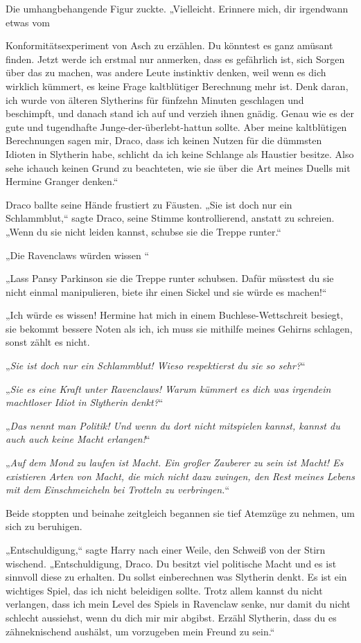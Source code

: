 {Die umhangbehangende Figur zuckte. „Vielleicht. Erinnere mich, dir irgendwann etwas vom

Konformitätsexperiment von Asch zu erzählen. Du könntest es ganz amüsant finden. Jetzt werde ich erstmal nur anmerken, dass es gefährlich ist, sich Sorgen über das zu machen, was andere Leute instinktiv denken, weil wenn es dich wirklich kümmert, es keine Frage kaltblütiger Berechnung mehr ist. Denk daran, ich wurde von älteren Slytherins für fünfzehn Minuten geschlagen und beschimpft, und danach stand ich auf und verzieh ihnen gnädig. Genau wie es der gute und tugendhafte Junge-der-überlebt-hattun sollte. Aber meine kaltblütigen Berechnungen sagen mir, Draco, dass ich keinen Nutzen für die dümmsten Idioten in Slytherin habe, schlicht da ich keine Schlange als Haustier besitze. Also sehe ichauch keinen Grund zu beachteten, wie sie über die Art meines Duells mit Hermine Granger denken.“

Draco ballte seine Hände frustiert zu Fäusten. „Sie ist doch nur ein Schlammblut,“ sagte Draco, seine Stimme kontrollierend, anstatt zu schreien. „Wenn du sie nicht leiden kannst, schubse sie die Treppe runter.“

„Die Ravenclaws würden wissen \later“

„Lass Pansy Parkinson sie die Treppe runter schubsen. Dafür müsstest du sie nicht einmal manipulieren, biete ihr einen Sickel und sie würde es machen!“

„Ich würde es wissen! Hermine hat mich in einem Buchlese-Wettschreit besiegt, sie bekommt bessere Noten als ich, ich muss sie mithilfe meines Gehirns schlagen, sonst zählt es nicht.

„\emph{Sie ist doch nur ein Schlammblut! Wieso respektierst du sie so sehr?}“

„\emph{Sie es eine Kraft unter Ravenclaws! Warum kümmert es dich was irgendein machtloser Idiot in Slytherin denkt?}“

„\emph{Das nennt man Politik! Und wenn du dort nicht mitspielen kannst, kannst du auch auch keine Macht erlangen!}“

„\emph{Auf dem} \emph{Mond} \emph{zu laufen ist Macht. Ein großer Zauberer zu sein ist Macht! Es existieren Arten von Macht, die mich nicht dazu zwingen, den Rest meines Lebens mit dem} \emph{Einschmeicheln bei Trotteln zu verbringen.}“

Beide stoppten und beinahe zeitgleich begannen sie tief Atemzüge zu nehmen, um sich zu beruhigen.

„Entschuldigung,“ sagte Harry nach einer Weile, den Schweiß von der Stirn wischend. „Entschuldigung, Draco. Du besitzt viel politische Macht und es ist sinnvoll diese zu erhalten. Du sollst einberechnen was Slytherin denkt. Es ist ein wichtiges Spiel, das ich nicht beleidigen sollte. Trotz allem kannst du nicht verlangen, dass ich mein Level des Spiels in Ravenclaw senke, nur damit du nicht schlecht aussiehst, wenn du dich mir mir abgibst. Erzähl Slytherin, dass du es zähneknischend aushälst, um vorzugeben mein Freund zu sein.“

}
